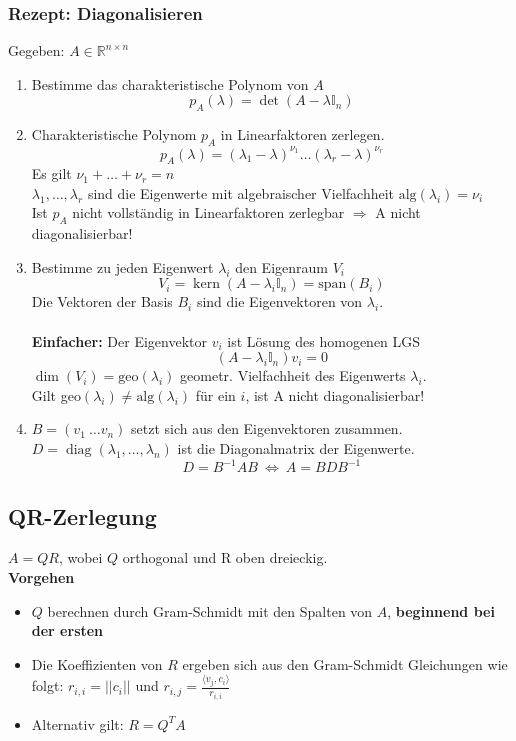 \documentclass[6pt,a4paper]{scrartcl}
\DeclareMathOperator{\diag}{diag}
\DeclareMathOperator{\Kern}{kern}
\begin{document}
\begin{multicols*}{4}
\subsubsection{Rezept: Diagonalisieren}
Gegeben: $A\in \mathbb{R}^{n\times n}$
\begin{enumerate}\itemsep0pt
\item Bestimme das charakteristische Polynom von $A$
\begin{equation*}
p_A(\lambda)=\det(A-\lambda \mathbb{I}_n)
\end{equation*}
\item Charakteristische Polynom $p_A$ in Linearfaktoren zerlegen.
\begin{equation*}
p_A(\lambda)=(\lambda_1-\lambda)^{\nu_1}\dots(\lambda_r-\lambda)^{\nu_r}
\end{equation*}
Es gilt $\nu_1 + \dots + \nu_r=n$ \\
$\lambda_1,\dots, \lambda_r$ sind die Eigenwerte mit algebraischer Vielfachheit $\text{alg}(\lambda_i)=\nu_i$\\
Ist $p_A$ nicht vollständig in Linearfaktoren zerlegbar $\Rightarrow$ A nicht diagonalisierbar!
\item Bestimme zu jeden Eigenwert $\lambda_i$ den Eigenraum $V_i$
\begin{equation*}
V_i=\Kern(A-\lambda_i\mathbb{I}_n)=\text{span}(B_i)
\end{equation*}
Die Vektoren der Basis $B_i$ sind die Eigenvektoren von $\lambda_i$.\\ \\
\textbf{Einfacher:} Der Eigenvektor $v_i$ ist Lösung des homogenen LGS
\begin{equation*}
(A-\lambda_i \mathbb{I}_n)v_i=0
\end{equation*}
$\dim(V_i)=\text{geo}(\lambda_i)$  geometr. Vielfachheit des Eigenwerts $\lambda_i$. \\
Gilt geo$(\lambda_i)\ne\text{alg}(\lambda_i)$ für ein $i$, ist A nicht diagonalisierbar!
\item $B=(v_1 \ \dots v_n)$ setzt sich aus den Eigenvektoren zusammen. \\
$D=\diag(\lambda_1,\dots,\lambda_n)$ ist die Diagonalmatrix der Eigenwerte.
\begin{equation*}
D=B^{-1}AB \ \Leftrightarrow \ A=BDB^{-1}
\end{equation*}
\end{enumerate}
\subsection{QR-Zerlegung}
$A = QR$, wobei $Q$ orthogonal und R oben dreieckig.\\
\textbf{Vorgehen}
\begin{itemize}\itemsep0pt
 \item $Q$ berechnen durch Gram-Schmidt mit den Spalten von $A$, \textbf{beginnend bei der ersten}
 \item Die Koeffizienten von $R$ ergeben sich aus den Gram-Schmidt Gleichungen wie folgt: $r_{i,i}=||c_i||$ und $r_{i,j}=\frac{\langle v_j,c_i \rangle}{r_{i,i}}$
 \item Alternativ gilt: $R = Q^TA$
\end{itemize}


\end{multicols*}
\end{document}
